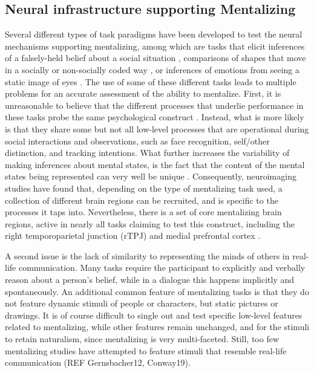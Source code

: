 \subsection*{Neural infrastructure supporting Mentalizing}

Several different types of task paradigms have been developed to test the neural mechanisms supporting mentalizing, among which are tasks that elicit inferences of a falsely-held belief about a social situation \citep[False Belief task; ][]{baron-cohen1985}, comparisons of shapes that move in a socially or non-socially coded way \citep[Social Animations task; ][]{castelli2002}, or inferences of emotions from seeing a static image of eyes \citep[Reading the Mind in the Eyes task, or RMET; ][]{baron-cohen2001RMET}. The use of some of these different tasks leads to multiple problems for an accurate assessment of the ability to mentalize. First, it is unreasonable to believe that the different processes that underlie performance in these tasks probe the same psychological construct \citep{schaafsma2015}. Instead, what is more likely is that they share some but not all low-level processes that are operational during social interactions and observations, such as face recognition, self/other distinction, and tracking intentions. What further increases the variability of making inferences about mental states, is the fact that the content of the mental states being represented can very well be unique \citep{conway2019}. Consequently, neuroimaging studies have found that, depending on the type of mentalizing task used, a collection of different brain regions can be recruited, and is specific to the processes it taps into. Nevertheless, there is a set of core mentalizing brain regions, active in nearly all tasks claiming to test this construct, including the right temporoparietal junction (rTPJ) and medial prefrontal cortex \citep[mPFC; ][]{schurz2014}. 


A second issue is the lack of similarity to representing the minds of others in real-life communication. Many tasks require the participant to explicitly and verbally reason about a person’s belief, while in a dialogue this happens implicitly and spontaneously. An additional common feature of mentalizing tasks is that they do not feature dynamic stimuli of people or characters, but static pictures or drawings. It is of course difficult to single out and test specific low-level features related to mentalizing, while other features remain unchanged, and for the stimuli to retain naturalism, since mentalizing is very multi-faceted. Still, too few mentalizing studies have attempted to feature stimuli that resemble real-life communication (REF Gernsbacher12, Conway19).


